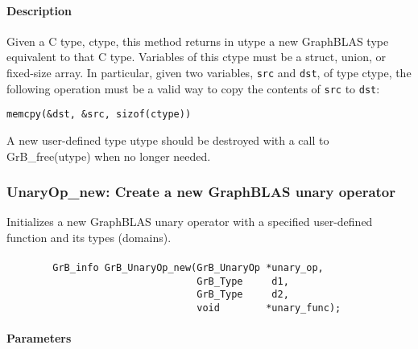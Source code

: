 \paragraph{Description}
Given a C type, {\sf ctype}, this method returns in {\sf utype} a new GraphBLAS type equivalent to that C type.
Variables of this {\sf ctype} must be a struct, union, or fixed-size array. In particular, given two variables,
{\tt src} and {\tt dst}, of type {\sf ctype}, the following operation must be a valid way to copy the contents of
{\tt src} to {\tt dst}:

\begin{center}
{\tt memcpy(\&dst, \&src, sizof({\sf ctype}))}
\end{center}

A new user-defined type {\sf utype} should be destroyed with a call to 
{\sf GrB\_free(utype)} when no longer needed.

\subsubsection{{\sf UnaryOp\_new}: Create a new GraphBLAS unary operator}

Initializes a new GraphBLAS unary operator with a specified user-defined 
function and its types (domains).

\paragraph{\syntax}

\begin{verbatim}
        GrB_info GrB_UnaryOp_new(GrB_UnaryOp *unary_op,
                                 GrB_Type     d1,
                                 GrB_Type     d2,
                                 void        *unary_func);
\end{verbatim}

\paragraph{Parameters}


